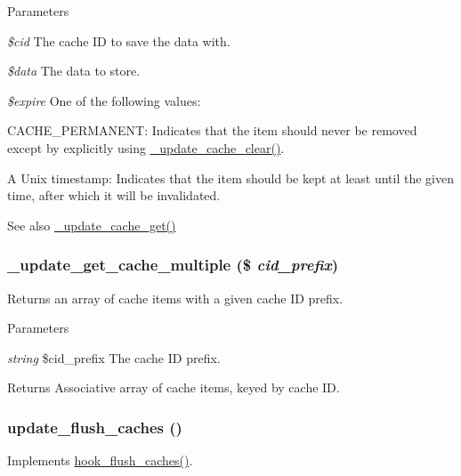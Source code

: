 \begin{DoxyParams}{Parameters}
\item[{\em \$cid}]The cache ID to save the data with. \item[{\em \$data}]The data to store. \item[{\em \$expire}]One of the following values:
\begin{DoxyItemize}
\item CACHE\_\-PERMANENT: Indicates that the item should never be removed except by explicitly using \hyperlink{group__update__status__cache_ga45fc31b5f9949fc0081ed148a9f378dd}{\_\-update\_\-cache\_\-clear()}.
\item A Unix timestamp: Indicates that the item should be kept at least until the given time, after which it will be invalidated.
\end{DoxyItemize}\end{DoxyParams}
\begin{DoxySeeAlso}{See also}
\hyperlink{group__update__status__cache_ga3f305bb51be069556fa20d692e286f40}{\_\-update\_\-cache\_\-get()} 
\end{DoxySeeAlso}
\hypertarget{group__update__status__cache_ga11c5e3cca6cd9eb1dc328f757448885f}{
\subsubsection[{\_\-update\_\-get\_\-cache\_\-multiple}]{\setlength{\rightskip}{0pt plus 5cm}\_\-update\_\-get\_\-cache\_\-multiple (\$ {\em cid\_\-prefix})}}
\label{group__update__status__cache_ga11c5e3cca6cd9eb1dc328f757448885f}
Returns an array of cache items with a given cache ID prefix.


\begin{DoxyParams}{Parameters}
\item[{\em string}]\$cid\_\-prefix The cache ID prefix.\end{DoxyParams}
\begin{DoxyReturn}{Returns}
Associative array of cache items, keyed by cache ID. 
\end{DoxyReturn}
\hypertarget{group__update__status__cache_ga9c94b82fd5dfa8483267b9af6042bbb2}{
\subsubsection[{update\_\-flush\_\-caches}]{\setlength{\rightskip}{0pt plus 5cm}update\_\-flush\_\-caches ()}}
\label{group__update__status__cache_ga9c94b82fd5dfa8483267b9af6042bbb2}
Implements \hyperlink{group__hooks_ga66531e6e564157b7ca45ed07549c9b97}{hook\_\-flush\_\-caches()}.

